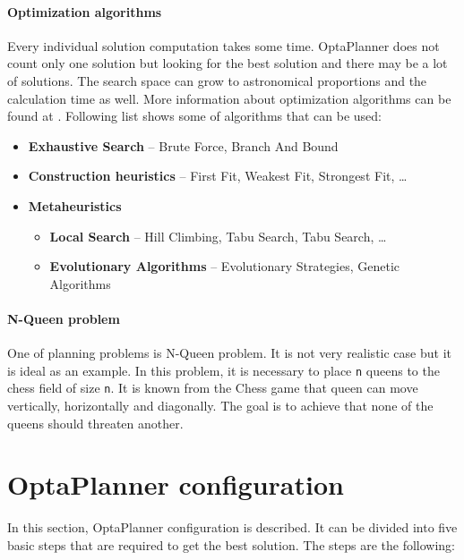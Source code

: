 \paragraph{Optimization algorithms}\label{optimalAlg}
Every individual solution computation takes some time. OptaPlanner does not count only one solution but looking for the best solution and there may be a lot of solutions. The search space can grow to astronomical proportions and the calculation time as well. More information about optimization algorithms can be found at \cite{OptaPlannerDoc}. Following list shows some of algorithms that can be used:
\begin{itemize}
\item \textbf{Exhaustive Search} -- Brute Force,  Branch And Bound
\item \textbf{Construction heuristics} --  First Fit, Weakest Fit,  Strongest Fit, \dots
\item \textbf{Metaheuristics}
\begin{itemize}
\item \textbf{Local Search} --  Hill Climbing, Tabu Search, Tabu Search, \dots
\item \textbf{Evolutionary Algorithms} -- Evolutionary Strategies, Genetic Algorithms
\end{itemize}
\end{itemize}

\paragraph{N-Queen problem}
One of planning problems is N-Queen problem. It is not very realistic case but it is ideal as an example. In this problem, it is necessary to place \texttt{n} queens to the chess field of size \texttt{n}. It is known from the Chess game that queen can move vertically, horizontally and diagonally. The goal is to achieve that none of the queens should threaten another.

\section{OptaPlanner configuration}\label{plannerConf}
In this section, OptaPlanner configuration is described. It can be divided into five basic steps that are required to get the best solution. The steps are the following:

